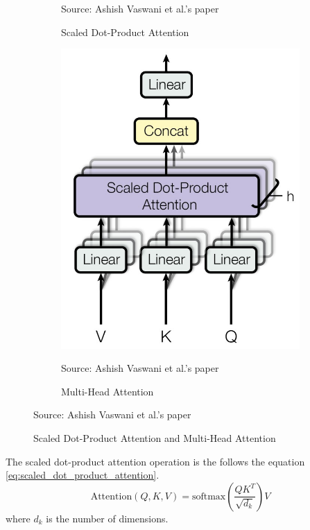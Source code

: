 \documentclass[12pt]{report}
\begin{document}
\begin{figure}[htbp]
\begin{subfigure}[t]{0.49\textwidth}
        \caption{Scaled Dot-Product Attention}
        Source: Ashish Vaswani et al.'s paper \cite{vaswani_attention_2017-1}
        \label{fig:scaled_dot_product_attention}
    \end{subfigure}
    \hfill
    \begin{subfigure}[t]{0.49\textwidth}
        \centering
        \includegraphics[width=.9 \textwidth]{images/related_works/transformer/multi_head_attention.jpg}
        \caption{Multi-Head Attention}
        Source: Ashish Vaswani et al.'s paper \cite{vaswani_attention_2017-1}
        \label{fig:multi_head_attention}
    \end{subfigure}
    \caption{Scaled Dot-Product Attention and Multi-Head Attention}
    Source: Ashish Vaswani et al.'s paper \cite{vaswani_attention_2017-1}
    \label{fig:arch:attention}
\end{figure}

The scaled dot-product attention operation is the follows the equation \ref{eq:scaled_dot_product_attention}.
\begin{equation}
    \text{Attention} (Q, K, V) = \text{softmax}(\frac{QK^T}{\sqrt{d_k}})V
    \label{eq:scaled_dot_product_attention}
\end{equation}
where $d_k$ is the number of dimensions.
\end{document}
